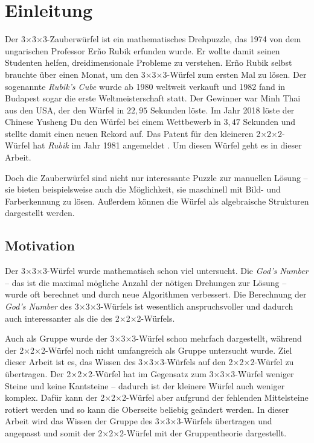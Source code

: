 \documentclass[12pt,a4paper, usenames, dvipsnames]{article}
\theoremstyle{mystyle}
\theoremstyle{definition}
\newcommand{\Ttwo}{2$\times$2$\times$2-}
\newcommand{\Tthree}{3$\times$3$\times$3-}
\begin{document}
\section{Einleitung}

\label{Kapitel_Einleitung}

Der \Tthree Zauberwürfel ist ein mathematisches Drehpuzzle, das 1974 von dem ungarischen Professor Er\~{n}o Rubik erfunden wurde. Er wollte damit seinen Studenten helfen, dreidimensionale Probleme zu verstehen. Er\~{n}o Rubik selbst brauchte über einen Monat, um den \Tthree Würfel zum ersten Mal zu lösen.
Der sogenannte \textit{Rubik's Cube} wurde ab 1980 weltweit verkauft und 1982 fand in Budapest sogar die erste Weltmeisterschaft statt. Der Gewinner war Minh Thai aus den USA, der den Würfel in $22,95$ Sekunden löste. \cite{RC} Im Jahr 2018 löste der Chinese Yusheng Du den Würfel bei einem Wettbewerb in $3,47$ Sekunden und stellte damit einen neuen Rekord auf. \cite{rekord}
Das Patent für den kleineren \Ttwo Würfel hat \textit{Rubik} im Jahr 1981 angemeldet \cite{patent}. Um diesen Würfel geht es in dieser Arbeit.

Doch die Zauberwürfel sind nicht nur interessante Puzzle zur manuellen Lösung -- sie bieten beispielsweise auch die Möglichkeit, sie maschinell mit Bild- und Farberkennung zu lösen. Außerdem können die Würfel als algebraische Strukturen dargestellt werden.

%
%
%
%
%
%
%
%
\subsection{Motivation} 




Der \Tthree Würfel wurde mathematisch schon viel untersucht. 
Die \textit{God's Number} -- das ist die maximal mögliche Anzahl der nötigen Drehungen zur Lösung -- wurde oft berechnet und durch neue Algorithmen verbessert. 
Die Berechnung der \textit{God's Number} des \Tthree Würfels ist wesentlich anspruchsvoller und dadurch auch interessanter als die des \Ttwo Würfels. 

Auch als Gruppe wurde der \Tthree Würfel schon mehrfach dargestellt, während der \Ttwo Würfel
noch nicht umfangreich als Gruppe untersucht wurde. Ziel dieser Arbeit ist es, das Wissen des \Tthree Würfels auf den \Ttwo Würfel zu übertragen. Der \Ttwo Würfel hat im Gegensatz zum \Tthree Würfel weniger Steine und keine Kantsteine -- dadurch ist der kleinere Würfel auch weniger komplex. Dafür kann der \Ttwo Würfel aber aufgrund der fehlenden Mittelsteine rotiert werden und so kann die Oberseite beliebig geändert werden. In dieser Arbeit wird das Wissen der Gruppe des \Tthree Würfels übertragen und angepasst und somit der \Ttwo Würfel mit der Gruppentheorie dargestellt.
\end{document}
